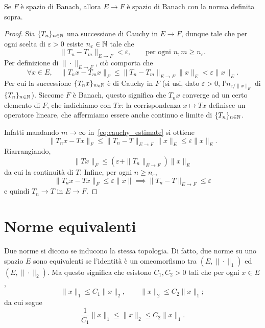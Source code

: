 \begin{lemma}
	Se $F$ è spazio di Banach, allora $E \to F$ è spazio di Banach con la norma definita sopra.
\end{lemma}
\begin{proof}
	Sia $\{T_n\}_{n \in \mathbb{N}}$ una successione di Cauchy in $E \to F$, dunque tale che per ogni scelta di $\varepsilon > 0$ esiste $n_\varepsilon \in \mathbb{N}$ tale che
	\begin{equation*}
		\|T_n - T_m\|_{E \to F} < \varepsilon, \qquad \text{per ogni $n , m \geq n_\varepsilon$}.
	\end{equation*}
	Per definizione di $\|\cdot\|_{E \to F}$, ciò comporta che
	\begin{equation}
	\label{eq:cauchy_estimate}
		\forall x \in E, \quad \|T_nx - T_mx\|_F \leq \|T_n - T_m\|_{E \to F}\|x\|_E < \varepsilon\|x\|_E.
	\end{equation}
	Per cui la successione $\{T_nx\}_{n \in \mathbb{N}}$ è di Cauchy in $F$ (si usi, dato $\varepsilon > 0$, l'$n_{\varepsilon/\|x\|_E}$ di $\{T_n\}_{n \in \mathbb{N}}$).
	Siccome $F$ è Banach, questo significa che $T_n x$ converge ad un certo elemento di $F$, che indichiamo con $Tx$: la corrispondenza $x \mapsto Tx$ definisce un operatore lineare, che affermiamo essere anche continuo e limite di $\{T_n\}_{n \in \mathbb{N}}$.

	Infatti mandando $m \to \infty$ in~\eqref{eq:cauchy_estimate} si ottiene
	\begin{equation*}
		\|T_n x - T x\|_F \leq \|T_n - T\|_{E \to F}\|x\|_E \leq \varepsilon \|x\|_E.
	\end{equation*}
	Riarrangiando,
	\begin{equation*}
		\|Tx\|_F \leq (\varepsilon + \|T_n\|_{E \to F})\|x\|_E
	\end{equation*}
	da cui la continuità di $T$. Infine, per ogni $n \geq n_\varepsilon$,
	\begin{equation*}
		\|T_n x - Tx\|_F \leq \varepsilon\|x\| \implies \|T_n - T\|_{E \to F} \leq \varepsilon
	\end{equation*}
	e quindi $T_n \to T$ in $E \to F$.
\end{proof}

\section{Norme equivalenti}
Due norme si dicono  se inducono la stessa topologia. Di fatto, due norme su uno spazio $E$ sono equivalenti se l'identità è un omeomorfismo tra $(E, \|\cdot\|_1)$ ed $(E, \|\cdot\|_2)$. Ma questo significa che esistono $C_1, C_2 > 0$ tali che per ogni $x \in E$,
\begin{equation*}
	\|x\|_1 \leq C_1 \|x\|_2, \qquad \|x\|_2 \leq C_2 \|x\|_1;
\end{equation*}
da cui segue
\begin{equation*}
	\frac1{C_1}\|x\|_1 \leq \|x\|_2 \leq C_2 \|x\|_1.
\end{equation*}

